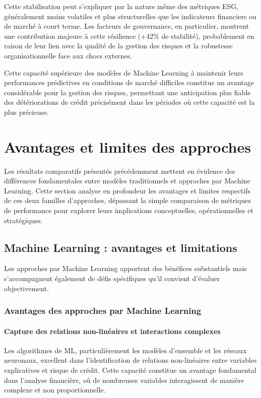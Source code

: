 Cette stabilisation peut s'expliquer par la nature même des métriques ESG, généralement moins volatiles et plus structurelles que les indicateurs financiers ou de marché à court terme. Les facteurs de gouvernance, en particulier, montrent une contribution majeure à cette résilience (+42\% de stabilité), probablement en raison de leur lien avec la qualité de la gestion des risques et la robustesse organisationnelle face aux chocs externes.

Cette capacité supérieure des modèles de Machine Learning à maintenir leurs performances prédictives en conditions de marché difficiles constitue un avantage considérable pour la gestion des risques, permettant une anticipation plus fiable des détériorations de crédit précisément dans les périodes où cette capacité est la plus précieuse.

\section{Avantages et limites des approches}

Les résultats comparatifs présentés précédemment mettent en évidence des différences fondamentales entre modèles traditionnels et approches par Machine Learning. Cette section analyse en profondeur les avantages et limites respectifs de ces deux familles d'approches, dépassant la simple comparaison de métriques de performance pour explorer leurs implications conceptuelles, opérationnelles et stratégiques.

\subsection{Machine Learning : avantages et limitations}

Les approches par Machine Learning apportent des bénéfices substantiels mais s'accompagnent également de défis spécifiques qu'il convient d'évaluer objectivement.

\subsubsection{Avantages des approches par Machine Learning}

\paragraph{Capture des relations non-linéaires et interactions complexes}

Les algorithmes de ML, particulièrement les modèles d'ensemble et les réseaux neuronaux, excellent dans l'identification de relations non-linéaires entre variables explicatives et risque de crédit. Cette capacité constitue un avantage fondamental dans l'analyse financière, où de nombreuses variables interagissent de manière complexe et non proportionnelle.

